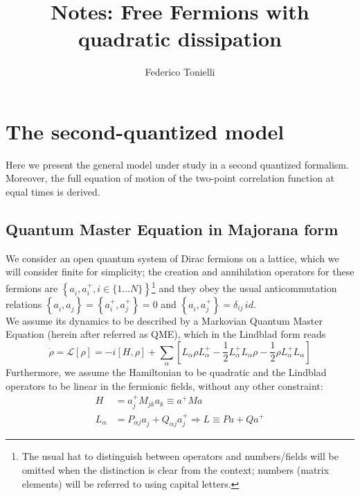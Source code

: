 \documentclass[a4paper,11pt]{article}
\title{Notes: Free Fermions with quadratic dissipation}
\author{Federico Tonielli}
\newcommand\blankpage{%
    \null
    \thispagestyle{empty}%
    \addtocounter{page}{-1}%
    \newpage}
\theoremstyle{remark}
\newcommand{\ro}{\rho}
\newcommand{\np}{\vskip 1.3cm}
\begin{document}
 \maketitle
 
 \tableofcontents
 \blankpage
 
 \section{The second-quantized model}
 Here we present the general model under study in a second quantized formalism.  Moreover, the full equation of motion of the two-point correlation function at equal times is derived.
  \np
  \subsection{Quantum Master Equation in Majorana form}
   We consider an open quantum system of Dirac fermions on a lattice, which we will consider finite for simplicity; the creation and annihilation operators for these fermions are $\left \{ a_i^{ },a_i^+, i\in \{1\dots N\} \right \} $\footnote{ The usual hat to distinguish between operators and numbers/fields will be omitted when the distinction is clear from the context; numbers (matrix elements) will be referred to using capital letters.} and they obey the usual anticommutation relations $\left\{a_i^{ },a_j^{ }\right\} = \left\{a_i^{+},a_j^+\right \}=0$ and $\left\{a_i^{ },a_j^+\right \} = \delta_{ij}\,id $.\\  We assume its dynamics to be described by a Markovian Quantum Master Equation (herein after referred as QME), which in the Lindblad form reads
   \[\dot{\ro}=\mathcal{L}[\ro]=-i\left[H,\ro\right]+\sum_{\alpha}\left[L_{\alpha}^{ }\ro L_{\alpha}^+ - \frac{1}{2}L_{\alpha}^+L_{\alpha}^{ }\ro - \frac{1}{2}\ro L_{\alpha}^+L_{\alpha}^{ }\right]  \]
   Furthermore, we assume the Hamiltonian to be quadratic and the Lindblad operators to be linear in the fermionic fields, without any other constraint: 
   \begin{subequations}        %
   \label{eq:quadr_dyn}         %
   \begin{align}
    H & = a_j^+M_{jk}a_k^{ } \equiv a^+Ma \label{eq:quadr_ham}\\         %
    L_{\alpha} & = P^{ }_{\alpha j}a_j^{ } + Q^{ }_{\alpha j}a_j^+ \Rightarrow L \equiv P a + Q a^+ \label{eq:quadr_lindb}
   \end{align}
   \end{subequations}
\end{document}
